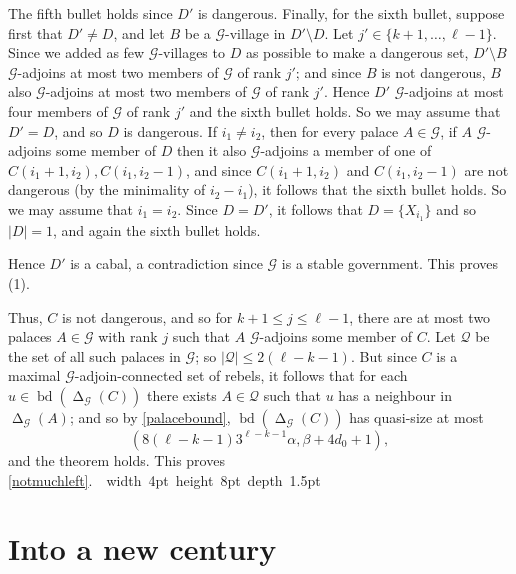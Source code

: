 \documentclass[titlepage,11pt]{article}
\newcommand\blackslug{\hbox{\hskip 1pt \vrule width 4pt height 8pt depth 1.5pt
		\hskip 1pt}}
\newcommand\bbox{\hfill \quad \blackslug \bigbreak}
\def\LL{,\ldots,}
\newcommand{\voro}{\operatorname{\Delta}}
\newcommand{\bd}{\operatorname{bd}}
\newcommand{\mac}{\mathcal}
\begin{document}
	The fifth bullet holds since $D'$ is dangerous. Finally, for the sixth bullet, 
	suppose first that $D'\ne D$, and let $B$ be a $\mac G$-village in $D'\setminus D$. Let $j'\in \{k+1\LL \ell-1\}$.
	Since we added as few $\mac G$-villages to $D$ as possible to make a dangerous set, $D'\setminus B$ $\mac G$-adjoins at most two  members of $\mac G$ of rank $j'$; and since
	$B$ is not dangerous, $B$ also $\mac G$-adjoins at most two  members of $\mac G$ of rank $j'$. Hence $D'$ $\mac G$-adjoins at most four 
	members of $\mac G$ of rank $j'$ and the sixth bullet holds. So we may assume that $D'=D$, and so $D$ is dangerous.
	If $i_1\ne i_2$, then for every palace $A\in \mac G$, if $A$ $\mac G$-adjoins some member
	of $D$
	then it also $\mac G$-adjoins a member of one of $C(i_1+1,i_2),C(i_1,i_2-1)$, and since $C(i_1+1,i_2)$ and $C(i_1,i_2-1)$ are not dangerous (by the minimality of $i_2-i_1$), it follows that
	the sixth bullet holds. So we may assume that $i_1=i_2$. Since $D=D'$, it follows that $D=\{X_{i_1}\}$ and so $|D|=1$, and again the sixth bullet holds.
	
	Hence $D'$ is a cabal, a contradiction since $\mac G$ is a stable government.
	This proves (1).
	
	\bigskip
	
	Thus, $C$ is not dangerous, and so 
	for $k+1\le j\le \ell-1$, there are at most two palaces $A\in \mac G$ with rank $j$ such that $A$ $\mac G$-adjoins some member of $C$.
	Let $\mac Q$ be the set of all such palaces in $\mac G$; so $|\mac Q|\le 2(\ell-k-1)$. But since $C$ is a maximal
	$\mac G$-adjoin-connected set of rebels, it follows that for each $u\in \bd(\voro_{\mac G}(C))$ there exists $A\in \mac Q$ such that $u$ has a neighbour in $\voro_{\mac G}(A)$;
	and so by \ref{palacebound}, $\bd(\voro_{\mac G}(C))$ has quasi-size at most
	$$\left(8(\ell-k-1) 3^{\ell-k-1}\alpha, \beta+4d_0+1\right),$$
	and the theorem holds.
	This proves \ref{notmuchleft}.~\bbox
	
	\section{Into a new century}\label{sec:newcent}
	
\end{document}
